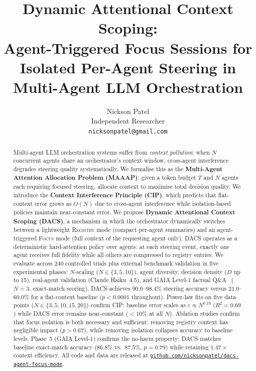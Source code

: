 \documentclass{article}
\title{Dynamic Attentional Context Scoping:\\
Agent-Triggered Focus Sessions for\\
Isolated Per-Agent Steering in Multi-Agent LLM Orchestration}
\author{%
  Nickson Patel \\
  Independent Researcher \\
  \texttt{nicksonpatel@gmail.com}
}
\begin{document}
\maketitle
\renewcommand{\arraystretch}{1.15}

\begin{abstract}
Multi-agent LLM orchestration systems suffer from \emph{context pollution}:
when $N$ concurrent agents share an orchestrator's context window,
cross-agent interference degrades steering quality systematically.
We formalise this as the \textbf{Multi-Agent Attention Allocation Problem
(MAAAP)}: given a token budget $T$ and $N$ agents each requiring focused
steering, allocate context to maximise total decision quality.
We introduce the \textbf{Context Interference Principle (CIP)},
which predicts that flat-context error grows as $O(N)$ due to
cross-agent interference while isolation-based policies maintain
near-constant error.
We propose \textbf{Dynamic Attentional Context Scoping (DACS)}, a
mechanism in which the orchestrator dynamically switches between a
lightweight \textsc{Registry} mode (compact per-agent summaries) and
an agent-triggered \textsc{Focus} mode (full context of the requesting
agent only).
DACS operates as a deterministic hard-attention policy over agents:
at each steering event, exactly one agent receives full fidelity while
all others are compressed to registry entries.
We evaluate across 240 controlled trials plus external benchmark
validation in five experimental phases:
$N$-scaling ($N{\in}\{3,5,10\}$), agent diversity, decision density
($D$ up to 15), real-agent validation (Claude Haiku~4.5), and
GAIA Level-1 factual Q\&A~\citep{gaia2023} ($N{=}3$, exact-match scoring).
DACS achieves $90.0$--$98.4\%$ steering accuracy versus $21.0$--$60.0\%$
for a flat-context baseline ($p < 0.0001$ throughout).
Power-law fits on five data points ($N\in\{3,5,10,15,20\}$) confirm CIP:
baseline error scales as
$\varepsilon \propto N^{0.19}$ ($R^2 = 0.69$) while DACS error remains
near-constant ($<10\%$ at all $N$).
Ablation studies confirm that focus isolation is both necessary and
sufficient: removing registry context has negligible impact ($p > 0.67$),
while removing isolation collapses accuracy to baseline levels.
Phase~5 (GAIA Level-1) confirms the no-harm property:
DACS matches baseline exact-match accuracy ($86.8\%$ vs.\ $87.5\%$,
$p{=}0.79$) while retaining $1.47\times$ context efficiency.
All code and data are released at
\href{https://github.com/nicksonpatel/dacs-agent-focus-mode}{\texttt{github.com/nicksonpatel/dacs-agent-focus-mode}}.
\end{abstract}
\end{document}
